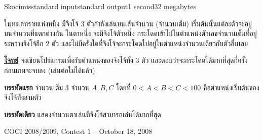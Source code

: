 \documentclass[11pt,a4paper]{article}
\begin{document}
\begin{problem}{Skocimis}{standard input}{standard output}{1 second}{32 megabytes}

ในทะเลทรายแห่งหนึ่ง มีจิงโจ้ 3 ตัวกำลังเล่นบนเส้นจำนวน (จำนวนเต็ม) เริ่มต้นนั้นแต่ละตัวจะอยู่บนจำนวนที่แตกต่างกัน ในตาหนึ่ง จะมีจิงโจ้ตัวหนึ่ง กระโดดเข้าไปในตำแหน่งตัวเลขจำนวนเต็มที่อยู่ระหว่างจิงโจ้อีก 2 ตัว และไม่มีครั้งใดที่จิงโจ้จะกระโดดไปอยู่ในตำแหน่งจำนวนเดียวกับตัวอื่นเลย

\underline{\textbf{โจทย์}} จงเขียนโปรแกรมเพื่อรับตำแหน่งของจิงโจ้ทั้ง 3 ตัว และตอบว่าจะกระโดดได้มากที่สุดกี่ครั้ง ก่อนเกมจะจบลง (เล่นต่อไม่ได้แล้ว)

\InputFile

\textbf{บรรทัดแรก} จำนวนเต็ม 3 จำนวน $A, B, C$ โดยที่ $0 < A < B < C < 100$ คือตำแหน่งเริ่มต้นของจิงโจ้ทั้งสามตัว

\OutputFile

\textbf{บรรทัดเดียว} แสดงจำนวนตาเล่นที่จิงโจ้สามารถเล่นได้มากที่สุด

\Source

COCI 2008/2009, Contest 1 – October 18, 2008

\Examples

\begin{example}
%
%
\end{example}

\end{problem}
\end{document}
